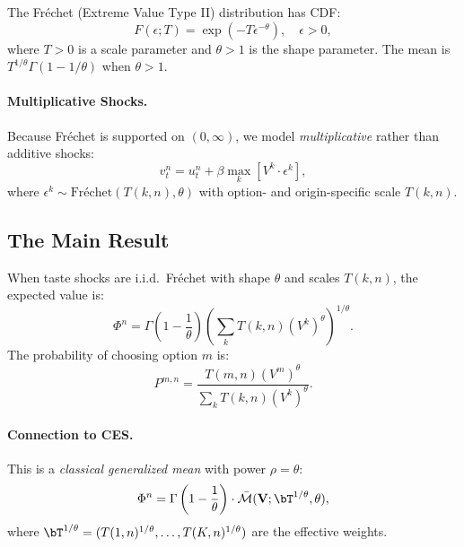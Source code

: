 The Fréchet (Extreme Value Type II) distribution has CDF:
\begin{equation}
F(\epsilon; T) = \exp\left( -T \epsilon^{-\theta} \right), \quad \epsilon > 0,
\end{equation}
where $T > 0$ is a scale parameter and $\theta > 1$ is the shape parameter. The mean is $T^{1/\theta} \Gamma(1 - 1/\theta)$ when $\theta > 1$.

\paragraph{Multiplicative Shocks.}

Because Fréchet is supported on $(0, \infty)$, we model \emph{multiplicative} rather than additive shocks:
\begin{equation}
\label{eq:payoff-frechet}
v_t^n = u_t^n + \beta \max_k \left[ V^k \cdot \epsilon^k \right],
\end{equation}
where $\epsilon^k \sim \text{Fréchet}(T(k,n), \theta)$ with option- and origin-specific scale $T(k,n)$.

\subsection{The Main Result}

\begin{theorem}
\label{thm:frechet}
When taste shocks are i.i.d.\ Fréchet with shape $\theta$ and scales $T(k,n)$, the expected value is:
\begin{equation}
\label{eq:frechet-value}
\boxed{\Phi^n = \Gamma\left(1 - \frac{1}{\theta}\right) \left( \sum_k T(k,n) \left( V^k \right)^\theta \right)^{1/\theta}.}
\end{equation}
The probability of choosing option $m$ is:
\begin{equation}
\label{eq:frechet-prob}
\boxed{P^{m,n} = \frac{T(m,n) (V^m)^\theta}{\sum_k T(k,n) (V^k)^\theta}.}
\end{equation}
\end{theorem}

\paragraph{Connection to CES.}

This is a \emph{classical generalized mean} with power $\rho = \theta$:
\begin{equation}
\Phi^n = \Gamma\left(1 - \frac{1}{\theta}\right) \cdot \Mbar(\bV; \bT^{1/\theta}, \theta),
\end{equation}
where $\bT^{1/\theta} = (T(1,n)^{1/\theta}, \ldots, T(K,n)^{1/\theta})$ are the effective weights.


